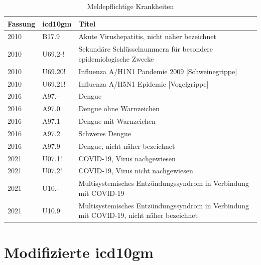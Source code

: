 \clearpage
\begin{table}[ht]
	\centering
	\small
	\caption[Meldepflichtige \acs{icd10gm}]{Meldepflichtige Krankheiten}
	\label{tab:meldung}
	\begin{tabular}{|l|l|p{10.5cm}|}
		\hline
		\rowcolor{lightgray} Fassung & \acs{icd10gm} & Titel \\ \hline
		2010 & B17.9 & Akute Virushepatitis, nicht näher bezeichnet \\ \hline
		2010 & U69.2-! & Sekundäre Schlüsselnummern für besondere epidemiologische Zwecke \\ \hline
		2010 & U69.20! & Influenza A/H1N1 Pandemie 2009 [Schweinegrippe] \\ \hline
		2010 & U69.21! & Influenza A/H5N1 Epidemie [Vogelgrippe] \\ \hline
		2016 & A97.- & Dengue \\ \hline
		2016 & A97.0 & Dengue ohne Warnzeichen \\ \hline
		2016 & A97.1 & Dengue mit Warnzeichen \\ \hline
		2016 & A97.2 & Schweres Dengue \\ \hline
		2016 & A97.9 & Dengue, nicht näher bezeichnet \\ \hline
		2021 & U07.1! & COVID-19, Virus nachgewiesen \\ \hline
		2021 & U07.2! & COVID-19, Virus nicht nachgewiesen \\ \hline
		2021 & U10.- & Multisystemisches Entzündungssyndrom in Verbindung mit COVID-19 \\ \hline
		2021 & U10.9 & Multisystemisches Entzündungssyndrom in Verbindung mit COVID-19, nicht näher bezeichnet \\ \hline
	\end{tabular}
\end{table}

\section{Modifizierte \acs{icd10gm}} \label{sec:updicd}

